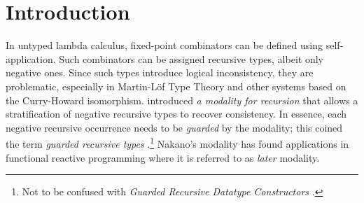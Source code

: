 
\section{Introduction}
\label{sec:intro}

In untyped lambda calculus, fixed-point combinators can be defined
using self-application.  Such combinators can be assigned recursive
types, albeit only negative ones.  Since such types introduce logical
inconsistency, they are problematic, especially in Martin-L\"of
Type Theory and other systems based on the Curry-Howard isomorphism.
\citet{nakano:lics00} introduced \emph{a modality for recursion} that
allows a stratification of negative recursive types to recover
consistency.  In essence, each negative recursive occurrence needs to
be \emph{guarded} by the modality; this coined the term \emph{guarded
  recursive types} \citep{birkedalMogelberg:lics13}.\footnote{Not to
  be confused with \emph{Guarded Recursive Datatype Constructors}
  \citep{xiChenChen:popl03}.} 
Nakano's modality has found applications in functional reactive
programming \citep{krishnaswamiBenton:lics11} where it is referred to
as \emph{later} modality.


